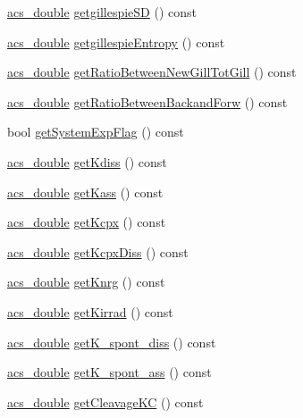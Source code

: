 \begin{DoxyCompactItemize}
\hyperlink{a00016_ab776853a005fcbf56af0424a2a4dd607}{acs\-\_\-double} \hyperlink{a00003_a41d9f79794b74845f2d00b4c0affea02}{getgillespie\-S\-D} () const 
\item 
\hyperlink{a00016_ab776853a005fcbf56af0424a2a4dd607}{acs\-\_\-double} \hyperlink{a00003_af4cba1a1f9c1c0106241ca5338b7906d}{getgillespie\-Entropy} () const 
\item 
\hyperlink{a00016_ab776853a005fcbf56af0424a2a4dd607}{acs\-\_\-double} \hyperlink{a00003_a98a4989029d77e99cf2ca9fb0eb1c2ab}{get\-Ratio\-Between\-New\-Gill\-Tot\-Gill} () const 
\item 
\hyperlink{a00016_ab776853a005fcbf56af0424a2a4dd607}{acs\-\_\-double} \hyperlink{a00003_aa0e7940868932ac4b26fd61943952528}{get\-Ratio\-Between\-Backand\-Forw} () const 
\item 
bool \hyperlink{a00003_a883327bbb969164eb8b3c2d1c941ca03}{get\-System\-Exp\-Flag} () const 
\item 
\hyperlink{a00016_ab776853a005fcbf56af0424a2a4dd607}{acs\-\_\-double} \hyperlink{a00003_ab429d2057ee1092bf210c29e70153f75}{get\-Kdiss} () const 
\item 
\hyperlink{a00016_ab776853a005fcbf56af0424a2a4dd607}{acs\-\_\-double} \hyperlink{a00003_aa862f1f98c6060747d6f1f30377671ff}{get\-Kass} () const 
\item 
\hyperlink{a00016_ab776853a005fcbf56af0424a2a4dd607}{acs\-\_\-double} \hyperlink{a00003_ac62c6b719db59d5829e3cc451b237f44}{get\-Kcpx} () const 
\item 
\hyperlink{a00016_ab776853a005fcbf56af0424a2a4dd607}{acs\-\_\-double} \hyperlink{a00003_a9091c4a0fe31f6d5f5330e7ebff297a3}{get\-Kcpx\-Diss} () const 
\item 
\hyperlink{a00016_ab776853a005fcbf56af0424a2a4dd607}{acs\-\_\-double} \hyperlink{a00003_a7615c746521a592ff1ab2d0793b14d89}{get\-Knrg} () const 
\item 
\hyperlink{a00016_ab776853a005fcbf56af0424a2a4dd607}{acs\-\_\-double} \hyperlink{a00003_a4c163b36e84cd8406aff4ab5d220a251}{get\-Kirrad} () const 
\item 
\hyperlink{a00016_ab776853a005fcbf56af0424a2a4dd607}{acs\-\_\-double} \hyperlink{a00003_a2c6ca24592b5feab891e43233c581711}{get\-K\-\_\-spont\-\_\-diss} () const 
\item 
\hyperlink{a00016_ab776853a005fcbf56af0424a2a4dd607}{acs\-\_\-double} \hyperlink{a00003_a6557765370b636bc7d4e02288b444c0e}{get\-K\-\_\-spont\-\_\-ass} () const 
\item 
\hyperlink{a00016_ab776853a005fcbf56af0424a2a4dd607}{acs\-\_\-double} \hyperlink{a00003_a771963196a27d3532cd7af4b98a5a9c5}{get\-Cleavage\-K\-C} () const 

\end{DoxyCompactItemize}
